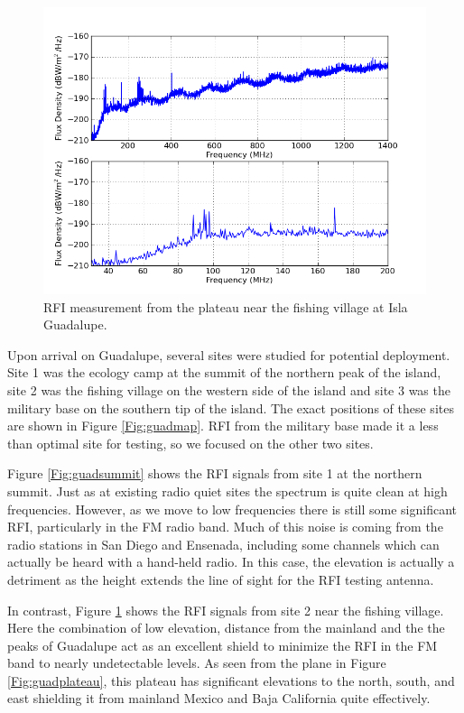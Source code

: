 \begin{figure}[htb]
\begin{center}
\includegraphics[width=0.95\linewidth]{RFI_testing/figures/GI_2__cal.png}
\caption{RFI measurement from the plateau near the fishing village at Isla Guadalupe.}
\label{Fig:guadlow}
\end{center}
\end{figure}

Upon arrival on Guadalupe, several sites were studied for potential deployment. Site 1 was the ecology camp at the summit of the northern peak of the island, site 2 was the fishing village on the western side of the island and site 3 was the military base on the southern tip of the island. The exact positions of these sites are shown in Figure \ref{Fig:guadmap}. RFI from the military base made it a less than optimal site for testing, so we focused on the other two sites.

Figure \ref{Fig:guadsummit} shows the RFI signals from site 1 at the northern summit. Just as at existing radio quiet sites the spectrum is quite clean at high frequencies. However, as we move to low frequencies there is still some significant RFI, particularly in the FM radio band. Much of this noise is coming from the radio stations in San Diego and Ensenada, including some channels which can actually be heard with a hand-held radio. In this case, the elevation is actually a detriment as the height extends the line of sight for the RFI testing antenna. 

In contrast, Figure \ref{Fig:guadlow} shows the RFI signals from site 2 near the fishing village. Here the combination of low elevation, distance from the mainland and the the peaks of Guadalupe act as an excellent shield to minimize the RFI in the FM band to nearly undetectable levels. As seen from the plane in Figure \ref{Fig:guadplateau}, this plateau has significant elevations to the north, south, and east shielding it from mainland Mexico and Baja California quite effectively. 

